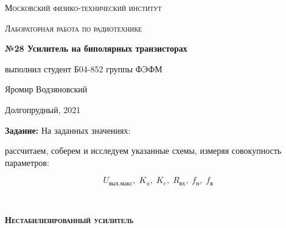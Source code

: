 \documentclass[a4paper]{article}
\begin{document}
\graphicspath{ {pictures/} }

\begin{titlepage}
	\centering
	\vspace{5cm}
    {\scshape\LARGE Московский физико-технический институт\par}
	\vspace{5cm}
	{\scshape\Large Лабораторная работа по радиотехнике \par}
	\vspace{1cm}
    {\huge\bfseries  №28 Усилитель на биполярных транзисторах \par}
	\vspace{1cm}
	\vfill
    \begin{flushright}
        {\large выполнил студент Б04-852 группы ФЭФМ}\par
        \vspace{0.3cm}
        {\LARGE Яромир Водзяновский}
    \end{flushright}
	\vfill
Долгопрудный, 2021
\end{titlepage}

\pagestyle{fancy} 
\fancyhead[C]{}
\fancyfoot[C]{ \noindent\rule{\textwidth}{0.4pt} \thepage }

\newcommand{\ap}{\approx}
\newcommand{\cb}[1]{\begin{center}\fbox{#1} \end{center}}
\newcommand{\cc}[1]{\begin{center} #1 \end{center}}

\newpage



\textbf{Задание:} На заданных значениях: 
\begin{center}
\end{center}

рассчитаем, соберем и исследуем указанные схемы, измеряя совокупность параметров:

\begin{equation}
    U_{вых. макс}, \; K_u, \; K_e,\; R_{вх}, \; f_н, \; f_в
\end{equation}



\

\begin{center}
    \scshape\large\textbf{Нестабилизированный усилитель}
\end{center}
\end{document}
